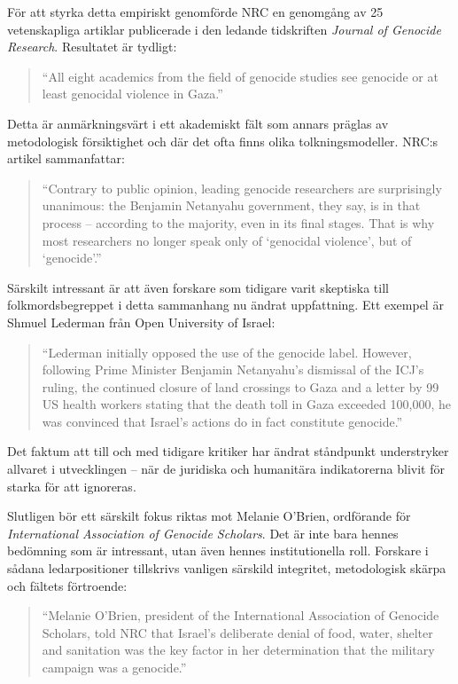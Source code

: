 För att styrka detta empiriskt genomförde NRC en genomgång av 25 vetenskapliga artiklar publicerade i den ledande tidskriften \textit{Journal of Genocide Research}. Resultatet är tydligt:

\begin{quote}
“All eight academics from the field of genocide studies see genocide or at least genocidal violence in Gaza.”
\end{quote}

Detta är anmärkningsvärt i ett akademiskt fält som annars präglas av metodologisk försiktighet och där det ofta finns olika tolkningsmodeller. NRC:s artikel sammanfattar:

\begin{quote}
“Contrary to public opinion, leading genocide researchers are surprisingly unanimous: the Benjamin Netanyahu government, they say, is in that process – according to the majority, even in its final stages. That is why most researchers no longer speak only of ‘genocidal violence’, but of ‘genocide’.”
\end{quote}

Särskilt intressant är att även forskare som tidigare varit skeptiska till folkmordsbegreppet i detta sammanhang nu ändrat uppfattning. Ett exempel är Shmuel Lederman från Open University of Israel:

\begin{quote}
“Lederman initially opposed the use of the genocide label. However, following Prime Minister Benjamin Netanyahu’s dismissal of the ICJ’s ruling, the continued closure of land crossings to Gaza and a letter by 99 US health workers stating that the death toll in Gaza exceeded 100,000, he was convinced that Israel’s actions do in fact constitute genocide.”
\end{quote}

Det faktum att till och med tidigare kritiker har ändrat ståndpunkt understryker allvaret i utvecklingen – när de juridiska och humanitära indikatorerna blivit för starka för att ignoreras.

Slutligen bör ett särskilt fokus riktas mot Melanie O’Brien, ordförande för \textit{International Association of Genocide Scholars}. Det är inte bara hennes bedömning som är intressant, utan även hennes institutionella roll. Forskare i sådana ledarpositioner tillskrivs vanligen särskild integritet, metodologisk skärpa och fältets förtroende:

\begin{quote}
“Melanie O’Brien, president of the International Association of Genocide Scholars, told NRC that Israel’s deliberate denial of food, water, shelter and sanitation was the key factor in her determination that the military campaign was a genocide.”
\end{quote}

